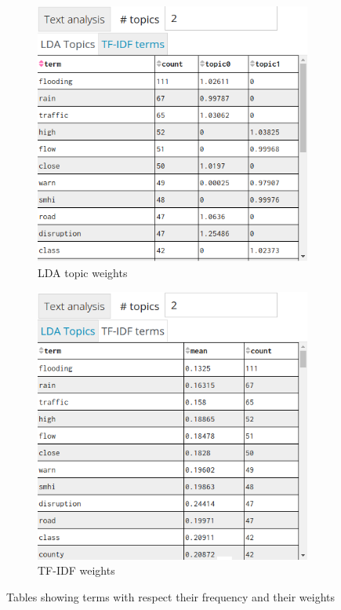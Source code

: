 \begin{figure}[H]
    \centering
    \begin{subfigure}[b]{0.45\textwidth}
        \centering
        \includegraphics[width=\textwidth]{./images/lda_topics.png}
        \caption{\ac{LDA} topic weights}
        \label{fig:lda_table}
    \end{subfigure}
    \hfill
    \begin{subfigure}[b]{0.45\textwidth}
        \centering
        \includegraphics[width=\textwidth, trim={0 0.5cm 0 0},clip]{./images/tf_idf.png}
        \caption{\ac{TF-IDF} weights}
        \label{fig:tfidf_table}
    \end{subfigure}
    \caption{Tables showing terms with respect their frequency and their weights}
    \label{fig:tables_lda_tfidf}
\end{figure}

